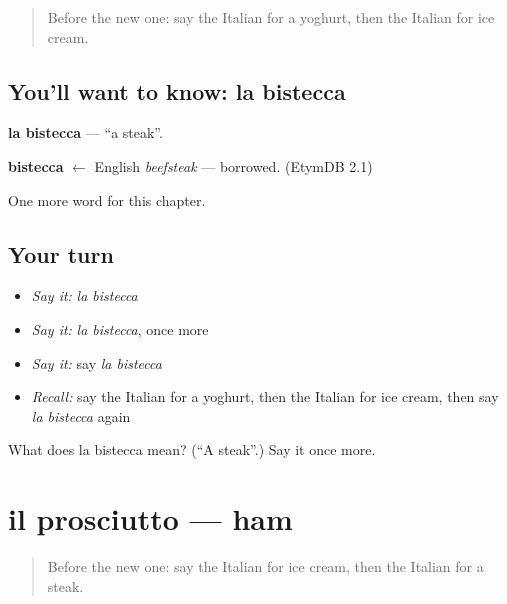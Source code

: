 \label{lesson:IT-C109-bistecca}



\begin{quote}
Before the new one: say the Italian for a yoghurt, then the Italian for ice cream.
\end{quote}

\subsection*{You'll want to know: la bistecca}
\textbf{la bistecca} — \textquotedblleft{}a steak\textquotedblright{}.

\begin{cousinweb}
\textbf{bistecca} $\leftarrow$ English \emph{beefsteak} — borrowed. (EtymDB 2.1)
\end{cousinweb}

\begin{grammarlens}[title={What you've built}]
One more word for this chapter.
\end{grammarlens}

\subsection*{Your turn}
\begin{itemize}
\raggedright
  \item \emph{Say it:} \emph{la bistecca}
  \item \emph{Say it:} \emph{la bistecca}, once more
  \item \emph{Say it:} say \emph{la bistecca}
  \item \emph{Recall:} say the Italian for a yoghurt, then the Italian for ice cream, then say \emph{la bistecca} again
\end{itemize}

\begin{tcolorbox}[breakable,colback=teal!4,colframe=teal!35!black,title={Before you move on}]
What does la bistecca mean? (\textquotedblleft{}A steak\textquotedblright{}.) Say it once more.
\end{tcolorbox}
\section[il prosciutto]{il prosciutto — ham}

\label{lesson:IT-C109-prosciutto}



\begin{quote}
Before the new one: say the Italian for ice cream, then the Italian for a steak.
\end{quote}

